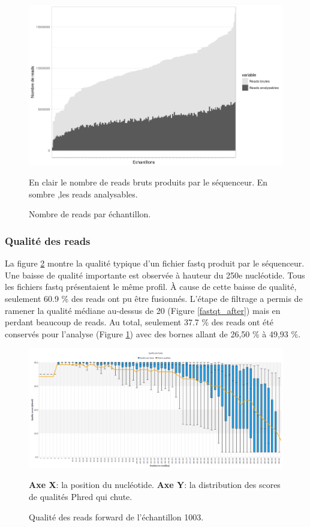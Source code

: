 \documentclass[12pt,a4paper]{article}
\begin{document}
\begin{figure}[ht]
\begin{center}
\includegraphics[scale=0.6]{img/pipeline.png}\hfill
\end{center}
\caption{Nombre de reads par échantillon.}
En clair le nombre de reads bruts produits par le séquenceur. En sombre ,les reads analysables.
\label{readcount}
\end{figure}



\subsubsection{Qualité des reads}
La figure \ref{fastqt} montre la qualité typique d'un fichier fastq produit par le séquenceur. Une baisse de qualité importante est observée à hauteur du 250e nucléotide. Tous les fichiers fastq présentaient le même profil.
À cause de cette baisse de qualité, seulement 60.9 \% des reads ont pu être fusionnés.
L'étape de filtrage a permis de ramener la qualité médiane au-dessus de 20 (Figure \ref{fastqt_after}) mais en perdant beaucoup de reads.
Au total, seulement 37.7 \% des reads ont été conservés pour l'analyse (Figure \ref{readcount}) avec des bornes allant de 26,50 \% à 49,93 \%.



\begin{figure}[ht]
\begin{center}
\includegraphics[scale=0.45]{img/1003_forward.png}\hfill
\end{center}
\caption{Qualité des reads forward de l'échantillon 1003.} \textbf{Axe X}: la position du nucléotide. \textbf{Axe Y}: la distribution des scores de qualités Phred qui chute.
\label{fastqt}
\end{figure}
\end{document}
